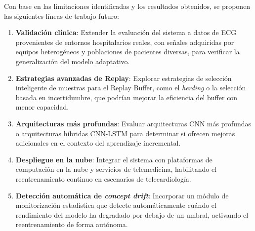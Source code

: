 Con base en las limitaciones identificadas y los resultados obtenidos, se proponen las siguientes líneas de trabajo futuro:

\begin{enumerate}
\item \textbf{Validación clínica}: Extender la evaluación del sistema a datos de ECG provenientes de entornos hospitalarios reales, con señales adquiridas por equipos heterogéneos y poblaciones de pacientes diversas, para verificar la generalización del modelo adaptativo.

\item \textbf{Estrategias avanzadas de Replay}: Explorar estrategias de selección inteligente de muestras para el Replay Buffer, como el \textit{herding} o la selección basada en incertidumbre, que podrían mejorar la eficiencia del buffer con menor capacidad.

\item \textbf{Arquitecturas más profundas}: Evaluar arquitecturas CNN más profundas o arquitecturas híbridas CNN-LSTM para determinar si ofrecen mejoras adicionales en el contexto del aprendizaje incremental.

\item \textbf{Despliegue en la nube}: Integrar el sistema con plataformas de computación en la nube y servicios de telemedicina, habilitando el reentrenamiento continuo en escenarios de telecardiología.

\item \textbf{Detección automática de \textit{concept drift}}: Incorporar un módulo de monitorización estadística que detecte automáticamente cuándo el rendimiento del modelo ha degradado por debajo de un umbral, activando el reentrenamiento de forma autónoma.
\end{enumerate}
